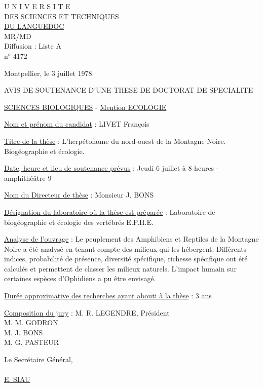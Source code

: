 U N I V E R S I T E\\
DES SCIENCES ET TECHNIQUES\\
\uline{DU LANGUEDOC}\\
MR/MD\\
Diffusion : Liste A\\
n° 4172

Montpellier, le 3 juillet 1978

AVIS DE SOUTENANCE D'UNE THESE DE DOCTORAT DE SPECIALITE

\uline{SCIENCES BIOLOGIQUES} - \uline{Mention ECOLOGIE}

\uline{Nom et prénom du candidat} : LIVET François

\uline{Titre de la thèse} : L'herpétofaune du nord-ouest de la Montagne Noire. Biogéographie et écologie.

\uline{Date, heure et lieu de soutenance prévus} : Jeudi 6 juillet à 8 heures - amphithéâtre 9

\uline{Nom du Directeur de thèse} : Monsieur J. BONS

\uline{Désignation du laboratoire où la thèse est préparée} : Laboratoire de biogéographie et écologie des vertébrés E.P.H.E.

\uline{Analyse de l'ouvrage} : Le peuplement des Amphibiens et Reptiles de la Montagne Noire a été analysé en tenant compte des milieux qui les hébergent. Différents indices, probabilité de présence, diversité spécifique, richesse spécifique ont été calculés et permettent de classer les milieux naturels. L'impact humain sur certaines espèces d'Ophidiens a pu être envisagé.

\uline{Durée approximative des recherches ayant abouti à la thèse} : 3 ans

\uline{Composition du jury} : M. R. LEGENDRE, Président\\
M. M. GODRON\\
M. J. BONS\\
M. G. PASTEUR

Le Secrétaire Général,\\

\\

\uline{E. SIAU}


